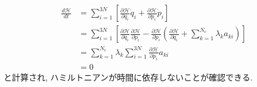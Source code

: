 \begin{align}
  \frac{d \mathcal{H}}{dt}
  &=
  \sum_{i=1}^{3N}
  \left[
      \frac{\partial \mathcal{H}}{\partial q_{i}} \dot{q}_{i}
    + \frac{\partial \mathcal{H}}{\partial p_{i}} \dot{p}_{i}
  \right]
  \\
  &=
  \sum_{i=1}^{3N}
  \left[
      \frac{\partial \mathcal{H}}{\partial q_{i}}
      \frac{\partial \mathcal{H}}{\partial p_{i}}
    - \frac{\partial \mathcal{H}}{\partial p_{i}}
      \left(
              \frac{\partial \mathcal{H}}{\partial q_{i}}
            + \sum_{k=1}^{N_{\mathrm{c}}} \lambda_{k} a_{ki}
      \right)
  \right]
  \\
  &=
  \sum_{k=1}^{N_{\mathrm{c}}} \lambda_{k}
  \sum_{i=1}^{3N} \frac{\partial \mathcal{H}}{\partial p_{i}} a_{ki}
  \\
  &=
  0
\end{align}
と計算され, ハミルトニアンが時間に依存しないことが確認できる. 




